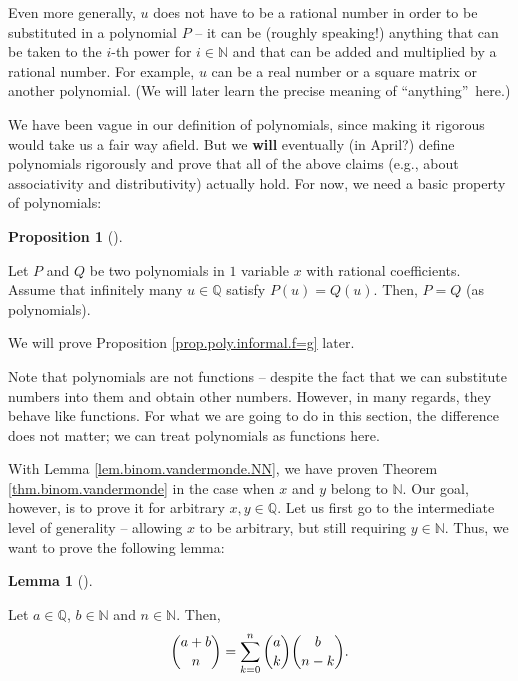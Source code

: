 \documentclass[numbers=enddot,12pt,final,onecolumn,notitlepage]{scrartcl}%
\numberwithin{exer}{subsection}
\theoremstyle{definition}
\newtheorem{lem}[theo]{Lemma}
\newenvironment{lemma}[1][]
{\begin{lem}[#1]\begin{leftbar}}
{\end{leftbar}\end{lem}}
\newtheorem{prop}[theo]{Proposition}
\newenvironment{proposition}[1][]
{\begin{prop}[#1]\begin{leftbar}}
{\end{leftbar}\end{prop}}
\let\sumnonlimits\sum
\renewcommand{\sum}{\sumnonlimits\limits}
\begin{document}
Even more generally, $u$ does not have to be a rational number in order to be
substituted in a polynomial $P$ -- it can be (roughly speaking!) anything that
can be taken to the $i$-th power for $i\in\mathbb{N}$ and that can be added
and multiplied by a rational number. For example, $u$ can be a real number or
a square matrix or another polynomial. (We will later learn the precise
meaning of \textquotedblleft anything\textquotedblright\ here.)

We have been vague in our definition of polynomials, since making it rigorous
would take us a fair way afield. But we \textbf{will} eventually (in April?)
define polynomials rigorously and prove that all of the above claims (e.g.,
about associativity and distributivity) actually hold. For now, we need a
basic property of polynomials:

\begin{proposition}
\label{prop.poly.informal.f=g}Let $P$ and $Q$ be two polynomials in $1$
variable $x$ with rational coefficients. Assume that infinitely many
$u\in\mathbb{Q}$ satisfy $P\left(  u\right)  =Q\left(  u\right)  $. Then,
$P=Q$ (as polynomials).
\end{proposition}

We will prove Proposition \ref{prop.poly.informal.f=g} later.

Note that polynomials are not functions -- despite the fact that we can
substitute numbers into them and obtain other numbers. However, in many
regards, they behave like functions. For what we are going to do in this
section, the difference does not matter; we can treat polynomials as functions here.

With Lemma \ref{lem.binom.vandermonde.NN}, we have proven Theorem
\ref{thm.binom.vandermonde} in the case when $x$ and $y$ belong to
$\mathbb{N}$. Our goal, however, is to prove it for arbitrary $x,y\in
\mathbb{Q}$. Let us first go to the intermediate level of generality --
allowing $x$ to be arbitrary, but still requiring $y\in\mathbb{N}$. Thus, we
want to prove the following lemma:

\begin{lemma}
\label{lem.binom.vandermonde.QN}Let $a\in\mathbb{Q}$, $b\in\mathbb{N}$ and
$n\in\mathbb{N}$. Then,%
\[
\dbinom{a+b}{n}=\sum_{k=0}^{n}\dbinom{a}{k}\dbinom{b}{n-k}.
\]

\end{lemma}
\end{document}
